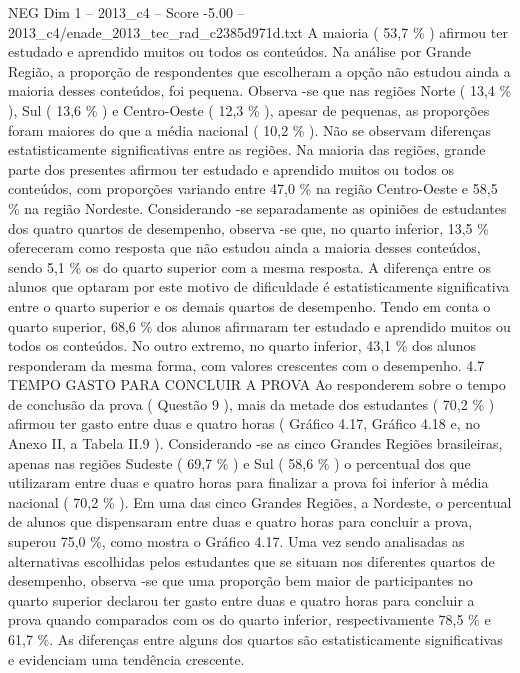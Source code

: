\begin{textsample}{NEG Dim 1 – 2013\_c4 – Score -5.00 – 2013\_c4/enade\_2013\_tec\_rad\_c2385d971d.txt}
A maioria ( 53,7 \% ) afirmou ter estudado e aprendido muitos ou todos os conteúdos.
Na análise por Grande Região, a proporção de respondentes que escolheram a opção não estudou ainda a maioria desses conteúdos, foi pequena.
Observa -se que nas regiões Norte ( 13,4 \% ), Sul ( 13,6 \% ) e Centro-Oeste ( 12,3 \% ), apesar de pequenas, as proporções foram maiores do que a média nacional ( 10,2 \% ).
Não se observam diferenças estatisticamente significativas entre as regiões.
Na maioria das regiões, grande parte dos presentes afirmou ter estudado e aprendido muitos ou todos os conteúdos, com proporções variando entre 47,0 \% na região Centro-Oeste e 58,5 \% na região Nordeste.
Considerando -se separadamente as opiniões de estudantes dos quatro quartos de desempenho, observa -se que, no quarto inferior, 13,5 \% ofereceram como resposta que não estudou ainda a maioria desses conteúdos, sendo 5,1 \% os do quarto superior com a mesma resposta.
A diferença entre os alunos que optaram por este motivo de dificuldade é estatisticamente significativa entre o quarto superior e os demais quartos de desempenho.
Tendo em conta o quarto superior, 68,6 \% dos alunos afirmaram ter estudado e aprendido muitos ou todos os conteúdos.
No outro extremo, no quarto inferior, 43,1 \% dos alunos responderam da mesma forma, com valores crescentes com o desempenho. 4.7 TEMPO GASTO PARA CONCLUIR A PROVA Ao responderem sobre o tempo de conclusão da prova ( Questão 9 ), mais da metade dos estudantes ( 70,2 \% ) afirmou ter gasto entre duas e quatro horas ( Gráfico 4.17, Gráfico 4.18 e, no Anexo II, a Tabela II.9 ).
Considerando -se as cinco Grandes Regiões brasileiras, apenas nas regiões Sudeste ( 69,7 \% ) e Sul ( 58,6 \% ) o percentual dos que utilizaram entre duas e quatro horas para finalizar a prova foi inferior à média nacional ( 70,2 \% ).
Em uma das cinco Grandes Regiões, a Nordeste, o percentual de alunos que dispensaram entre duas e quatro horas para concluir a prova, superou 75,0 \%, como mostra o Gráfico 4.17.
Uma vez sendo analisadas as alternativas escolhidas pelos estudantes que se situam nos diferentes quartos de desempenho, observa -se que uma proporção bem maior de participantes no quarto superior declarou ter gasto entre duas e quatro horas para concluir a prova quando comparados com os do quarto inferior, respectivamente 78,5 \% e 61,7 \%.
As diferenças entre alguns dos quartos são estatisticamente significativas e evidenciam uma tendência crescente.

\end{textsample}
